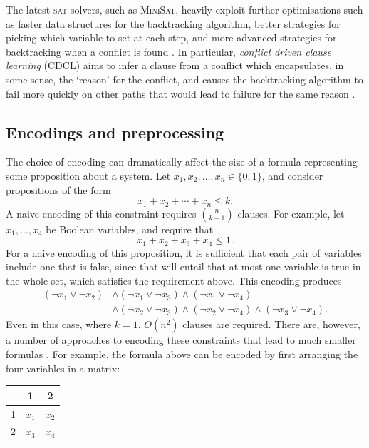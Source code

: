 \documentclass[proof,pdftex,11pt,a4,titlepage]{article}
\newcommand{\sat}{\textsc{sat}}
\begin{document}
The latest \sat{}-solvers, such as \textsc{MiniSat}, heavily exploit further optimisations such as faster data structures for the backtracking algorithm, better strategies for picking which variable to set at each step, and more advanced strategies for backtracking when a conflict is found \cite{Een:2003}. In particular, \emph{conflict driven clause learning} (CDCL) aims to infer a clause from a conflict which encapsulates, in some sense, the `reason' for the conflict, and causes the backtracking algorithm to fail more quickly on other paths that would lead to failure for the same reason \cite{Marques:1999,Moskewicz:2001}.

\subsection{Encodings and preprocessing}
\label{sec:encoding}

The choice of encoding can dramatically affect the size of a formula representing some proposition about a system. Let $x_1, x_2, \ldots, x_n \in \{0, 1\}$, and consider propositions of the form
\[x_1 + x_2 + \cdots + x_n \leq k.\]
A naive encoding of this constraint requires ${n \choose k+1}$ clauses. For example, let $x_1, \ldots, x_4$ be Boolean variables, and require that
\[x_1 + x_2 + x_3 + x_4 \leq 1.\]
For a naive encoding of this proposition, it is sufficient that each pair of variables include one that is false, since that will entail that at most one variable is true in the whole set, which satisfies the requirement above. This encoding produces
\begin{align*}
  (\neg x_1 \vee \neg x_2) & \wedge (\neg x_1 \vee \neg x_3) \wedge (\neg x_1 \vee \neg x_4) \\
  & \wedge (\neg x_2 \vee \neg x_3) \wedge (\neg x_2 \vee \neg x_4) \wedge (\neg x_3 \vee \neg x_4).
\end{align*}
Even in this case, where $k=1$, $O(n^2)$ clauses are required. There are, however, a number of approaches to encoding these constraints that lead to much smaller formulas \cite{Biere:2014}. For example, the formula above can be encoded by first arranging the four variables in a matrix:

\begin{center}
  \begin{tabular}{c|cc}
      & 1 & 2 \\ \hline
    1 & $x_1$ & $x_2$ \\
    2 & $x_3$ & $x_4$
  \end{tabular}
\end{center}
\end{document}
